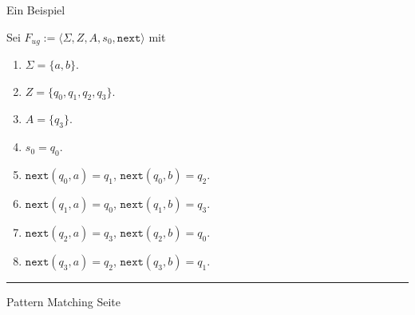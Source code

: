 \begin{slide}{}
\normalsize

\begin{center}
Ein Beispiel
\end{center}
\vspace*{0.5cm}

\footnotesize
{}

Sei  $F_{ug} := \langle \Sigma, Z, A, s_0, \mathtt{next}  \rangle$ mit
\begin{enumerate}
\item $\Sigma = \{a,b\}$.
\item $Z = \{ q_0, q_1, q_2, q_3 \}$.
\item $A = \{ q_3 \}$.
\item $s_0 = q_0$.
\item $\mathtt{next}(q_0, a) = q_1$, $\mathtt{next}(q_0, b) = q_2$.
\item $\mathtt{next}(q_1, a) = q_0$, $\mathtt{next}(q_1, b) = q_3$.
\item $\mathtt{next}(q_2, a) = q_3$, $\mathtt{next}(q_2, b) = q_0$.
\item $\mathtt{next}(q_3, a) = q_2$, $\mathtt{next}(q_3, b) = q_1$.
\end{enumerate}

\vspace*{\fill}
\tiny \addtocounter{mypage}{1}
\rule{17cm}{1mm}
Pattern Matching \hspace*{\fill} Seite 
\end{slide}



